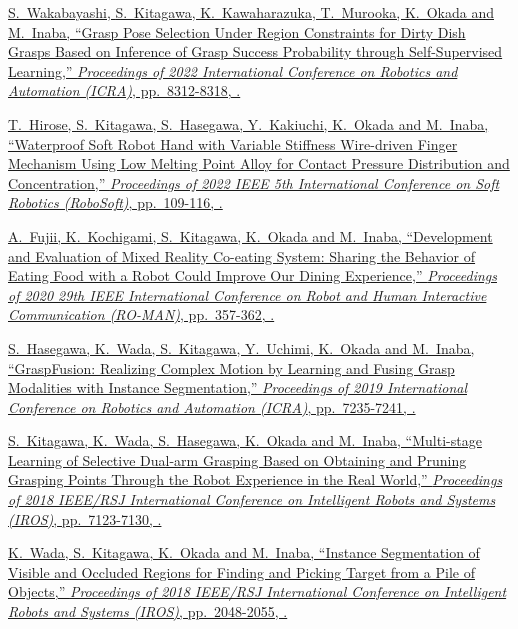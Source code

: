 \documentclass[letterpaper,MMMyyyy,nonstopmode]{simpleresumecv}
\begin{document}
\begin{Body}
\BulletItem
\href{https://doi.org/10.1109/ICRA46639.2022.9812084}
{S.~Wakabayashi, \underline{S.~Kitagawa}, K.~Kawaharazuka, T.~Murooka, K.~Okada and M.~Inaba,
``Grasp Pose Selection Under Region Constraints for Dirty Dish Grasps Based on Inference of Grasp Success Probability through Self-Supervised Learning,''
\textit{Proceedings of 2022 International Conference on Robotics and Automation (ICRA)},
pp.~8312-8318,
.}

\BulletItem
\href{https://doi.org/10.1109/RoboSoft54090.2022.9762208}
{T.~Hirose, \underline{S.~Kitagawa}, S.~Hasegawa, Y.~Kakiuchi, K.~Okada and M.~Inaba,
``Waterproof Soft Robot Hand with Variable Stiffness Wire-driven Finger Mechanism Using Low Melting Point Alloy for Contact Pressure Distribution and Concentration,''
\textit{Proceedings of 2022 IEEE 5th International Conference on Soft Robotics (RoboSoft)},
pp.~109-116,
.}

\BulletItem
\href{https://doi.org/10.1109/RO-MAN47096.2020.9223518}
{A.~Fujii, K.~Kochigami, \underline{S.~Kitagawa}, K.~Okada and M.~Inaba,
``Development and Evaluation of Mixed Reality Co-eating System: Sharing the Behavior of Eating Food with a Robot Could Improve Our Dining Experience,''
\textit{Proceedings of 2020 29th IEEE International Conference on Robot and Human Interactive Communication (RO-MAN)},
pp.~357-362,
.}

\BulletItem
\href{https://doi.org/10.1109/ICRA.2019.8793710}
{S.~Hasegawa, K.~Wada, \underline{S.~Kitagawa}, Y.~Uchimi, K.~Okada and M.~Inaba,
``GraspFusion: Realizing Complex Motion by Learning and Fusing Grasp Modalities with Instance Segmentation,''
\textit{Proceedings of 2019 International Conference on Robotics and Automation (ICRA)},
pp.~7235-7241,
.}

\BulletItem
\href{https://doi.org/10.1109/IROS.2018.8593752}
{\underline{S.~Kitagawa}, K.~Wada, S.~Hasegawa, K.~Okada and M.~Inaba,
``Multi-stage Learning of Selective Dual-arm Grasping Based on Obtaining and Pruning Grasping Points Through the Robot Experience in the Real World,''
\textit{Proceedings of 2018 IEEE/RSJ International Conference on Intelligent Robots and Systems (IROS)},
pp.~7123-7130,
.}

\BulletItem
\href{https://doi.org/10.1109/IROS.2018.8593690}
{K.~Wada, \underline{S.~Kitagawa}, K.~Okada and M.~Inaba,
``Instance Segmentation of Visible and Occluded Regions for Finding and Picking Target from a Pile of Objects,''
\textit{Proceedings of 2018 IEEE/RSJ International Conference on Intelligent Robots and Systems (IROS)},
pp.~2048-2055,
.}


\end{Body}
\end{document}
